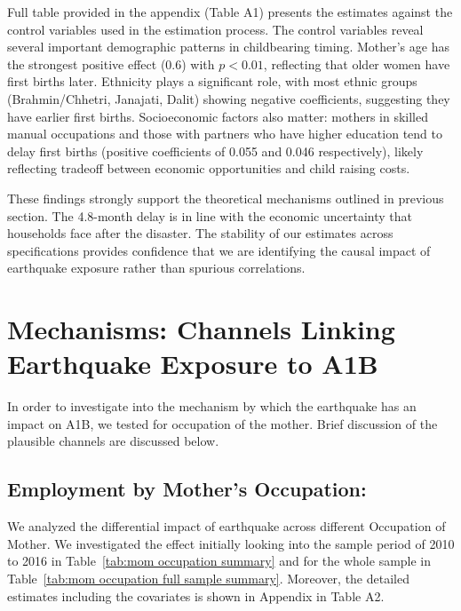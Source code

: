 \documentclass[11pt,a4paper]{article}
\begin{document}
\vspace{0.25cm}

Full table provided in the appendix (Table A1) presents the estimates against the control variables used in the estimation process. The control variables reveal several important demographic patterns in childbearing timing. Mother's age has the strongest positive effect (0.6) with $p<0.01$, reflecting that older women have first births later. Ethnicity plays a significant role, with most ethnic groups (Brahmin/Chhetri, Janajati, Dalit) showing negative coefficients, suggesting they have earlier first births. Socioeconomic factors also matter: mothers in skilled manual occupations and those with partners who have higher education tend to delay first births (positive coefficients of 0.055 and 0.046 respectively), likely reflecting tradeoff between economic opportunities and child raising costs. 

\vspace{0.25 cm}

These findings strongly support the theoretical mechanisms outlined in previous section. The 4.8-month delay is in line with the economic uncertainty that households face after the disaster.  The stability of our estimates across specifications provides confidence that we are identifying the causal impact of earthquake exposure rather than spurious correlations.

\vspace{0.25 cm}

\section{Mechanisms: Channels Linking Earthquake Exposure to A1B}

In order to investigate into the mechanism by which the earthquake has an impact on A1B, we tested for occupation of the mother. Brief discussion of the plausible channels are discussed below.

\vspace{0.25 cm}

\subsection{Employment by Mother's Occupation:}



We analyzed the differential impact of earthquake across different Occupation of Mother. We investigated the effect initially looking into the sample period of 2010 to 2016 in Table~\ref{tab:mom occupation summary} and for the whole sample in Table~\ref{tab:mom occupation full sample summary}. Moreover, the detailed estimates including the covariates is shown in Appendix in Table A2.
\end{document}
